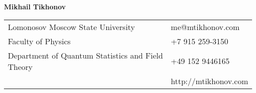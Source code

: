 \documentclass[letterpaper,10pt,oneside,utf8]{article}
\begin{document}
	

	
	\noindent  \LARGE{\textbf{Mikhail Tikhonov}}  \\
	\vspace{-2ex}
	\normalsize
	
	
	
	\begin{center}
		\begin{tabular}{l l}
			Lomonosov Moscow State University   & \hspace{1in} 
			{me@mtikhonov.com} \\
			Faculty of Physics   & \hspace{1in} +7 915 259-3150 \\
			Department of Quantum Statistics and Field Theory         &\hspace{1in} +49 152 9446165  \\
			 & \hspace{1in} http://mtikhonov.com \\
		\end{tabular}
	\end{center}
	
	\vspace{1em}
	
\end{document}
